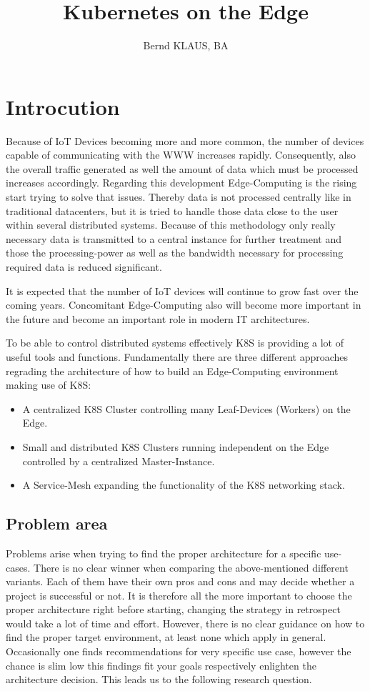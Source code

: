 \documentclass[MSC,Master,english]{twbook}%
\title{Kubernetes on the Edge}
\author{Bernd KLAUS, BA}
\begin{document}
\maketitle
\chapter{Introcution}
\label{chap:introduction}
Because of \ac{IoT} Devices becoming more and more common, the number of devices capable of communicating with the \ac{WWW} increases rapidly. Consequently, also the overall traffic generated as well the amount of data which must be processed increases accordingly. Regarding this development Edge-Computing is the rising start trying to solve that issues. Thereby data is not processed centrally like in traditional datacenters, but it is tried to handle those data close to the user within several distributed systems. Because of this methodology only really necessary data is transmitted to a central instance for further treatment and those the processing-power as well as the bandwidth necessary for processing required data is reduced significant. \par It is expected that the number of IoT devices will continue to grow fast\cite{SotE21} over the coming years. Concomitant Edge-Computing also will become more important in the future and become an important role in modern \ac{IT} architectures. \par To be able to control distributed systems effectively \ac{K8S} is providing a lot of useful tools and functions. Fundamentally there are three different approaches regrading the architecture of how to build an Edge-Computing environment making use of \ac{K8S}:

\begin{itemize}
    \label{item:architecture}
    \item A centralized \ac{K8S} Cluster controlling many Leaf-Devices (Workers) on the Edge.
    \item Small and distributed \ac{K8S} Clusters running independent on the Edge controlled by a
    centralized Master-Instance.
    \item A Service-Mesh expanding the functionality of the \ac{K8S} networking stack.
\end{itemize}

\section{Problem area}
Problems arise when trying to find the proper architecture for a specific use-cases. There is no clear winner when comparing the above-mentioned different variants. Each of them  have their own pros and cons and may decide whether a project is successful or not. It is therefore all the more important to choose the proper architecture right before starting, changing the strategy in retrospect would take a lot of time and effort. However, there is no clear guidance on how to find the proper target environment, at least none which apply in general. Occasionally one finds recommendations for very specific use case, however the chance is slim low this findings fit your goals respectively enlighten the architecture decision. This leads us to the following research question.
\end{document}
